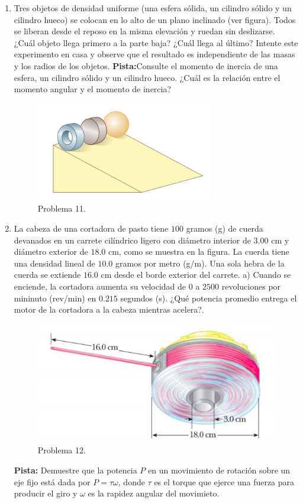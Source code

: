 \documentclass{article}
\begin{document}
\begin{enumerate}
\item Tres objetos de densidad uniforme (una esfera sólida, un cilindro sólido y un cilindro hueco) se colocan en lo alto de un plano inclinado (ver figura). Todos se liberan desde el reposo en la misma elevación y ruedan sin deslizarse. ¿Cuál objeto llega primero a la parte baja? ¿Cuál llega al último? Intente este experimento en casa y observe que el resultado es independiente de las masas y los radios de los objetos. \textbf{Pista:}Consulte el momento de inercia de una esfera, un cilindro sólido y un cilindro hueco. ¿Cuál es la relación entre el momento angular y el momento de inercia?

\begin{figure}[H]
\centering
\includegraphics[scale=0.5]{problema_11.png}
\caption{Problema 11.}
\end{figure}

\item La cabeza de una cortadora de pasto tiene $100$ gramos (g) de cuerda devanados en un carrete cilíndrico ligero con diámetro interior de $3$.$00$ cm y diámetro exterior de $18$.$0$ cm, como se muestra en la figura. La cuerda tiene una densidad lineal de $10$.$0$ gramos por metro (g/m). Una sola hebra de la cuerda se extiende $16$.$0$ cm desde el borde exterior del carrete. a) Cuando se enciende, la cortadora aumenta su velocidad de $0$ a $2500$ revoluciones por mininuto (rev/min) en $0$.$215$ segundos (s). ¿Qué potencia promedio entrega el motor de la cortadora a la cabeza mientras acelera?.


\begin{figure}[H]
\centering
\includegraphics[scale=0.4]{problema_12.png}
\caption{Problema 12.}
\end{figure}

\textbf{Pista:} Demuestre que la potencia $P$ en un movimiento de rotación sobre un eje fijo está dada por $P=\tau\omega$, donde $\tau$ es el torque que ejerce una fuerza para producir el giro y $\omega$ es la rapidez angular del movimieto.


\end{enumerate}
\end{document}
